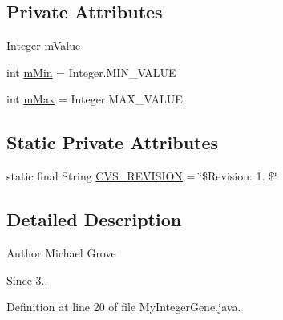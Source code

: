 \subsection*{Private Attributes}
\begin{DoxyCompactItemize}
\item 
Integer \hyperlink{classexamples_1_1math_1_1ga_1_1_my_integer_gene_a78c8e8d11e0177367a038a7b33982f5f}{m\-Value}
\item 
int \hyperlink{classexamples_1_1math_1_1ga_1_1_my_integer_gene_a1755fecb014bc107e32a40b8ecea8e8f}{m\-Min} = Integer.\-M\-I\-N\-\_\-\-V\-A\-L\-U\-E
\item 
int \hyperlink{classexamples_1_1math_1_1ga_1_1_my_integer_gene_a887b95f2e9f1456203da59b931addf4e}{m\-Max} = Integer.\-M\-A\-X\-\_\-\-V\-A\-L\-U\-E
\end{DoxyCompactItemize}
\subsection*{Static Private Attributes}
\begin{DoxyCompactItemize}
\item 
static final String \hyperlink{classexamples_1_1math_1_1ga_1_1_my_integer_gene_ae3c0ed81563e7c5671aee01358a66443}{C\-V\-S\-\_\-\-R\-E\-V\-I\-S\-I\-O\-N} = \char`\"{}\$Revision\-: 1. \$\char`\"{}
\end{DoxyCompactItemize}


\subsection{Detailed Description}
\begin{DoxyAuthor}{Author}
Michael Grove 
\end{DoxyAuthor}
\begin{DoxySince}{Since}
3.. 
\end{DoxySince}


Definition at line 20 of file My\-Integer\-Gene.\-java.



